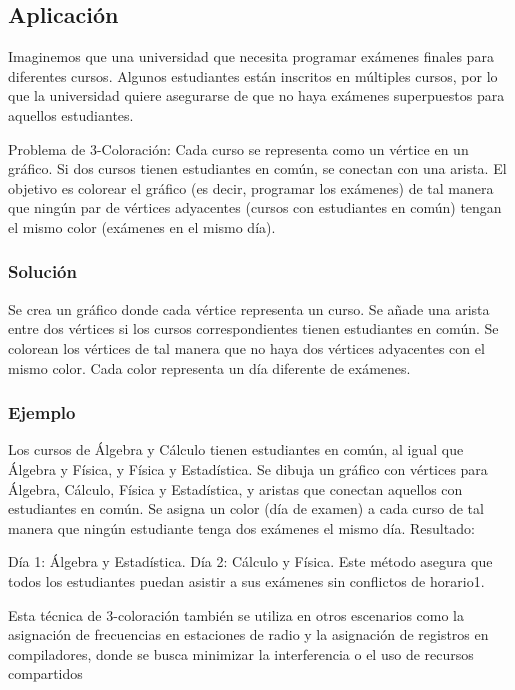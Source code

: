 \subsection{\textcolor{Contraste4}{Aplicación}}

Imaginemos que una universidad que necesita programar exámenes finales para diferentes cursos. 
Algunos estudiantes están inscritos en múltiples cursos, por lo que la universidad quiere asegurarse 
de que no haya exámenes superpuestos para aquellos estudiantes.

Problema de 3-Coloración: Cada curso se representa como un vértice en un gráfico. Si dos cursos 
tienen estudiantes en común, se conectan con una arista. El objetivo es colorear el gráfico 
(es decir, programar los exámenes) de tal manera que ningún par de vértices adyacentes 
(cursos con estudiantes en común) tengan el mismo color (exámenes en el mismo día).

\subsubsection*{\textcolor{Contraste3}{Solución}}

Se crea un gráfico donde cada vértice representa un curso.
Se añade una arista entre dos vértices si los cursos correspondientes tienen estudiantes en común.
Se colorean los vértices de tal manera que no haya dos vértices adyacentes con el mismo color. Cada 
color representa un día diferente de exámenes.

\subsubsection*{\textcolor{Contraste3}{Ejemplo}}

Los cursos de Álgebra y Cálculo tienen estudiantes en común, al igual que Álgebra y Física, y 
Física y Estadística.
Se dibuja un gráfico con vértices para Álgebra, Cálculo, Física y Estadística, y aristas que conectan 
aquellos con estudiantes en común.
Se asigna un color (día de examen) a cada curso de tal manera que ningún estudiante tenga dos exámenes el mismo día.
Resultado:

Día 1: Álgebra y Estadística.
Día 2: Cálculo y Física.
Este método asegura que todos los estudiantes puedan asistir a sus exámenes sin conflictos de horario1.

Esta técnica de 3-coloración también se utiliza en otros escenarios como la asignación de frecuencias en estaciones 
de radio y la asignación de registros en compiladores, donde se busca minimizar la interferencia o el uso de 
recursos compartidos